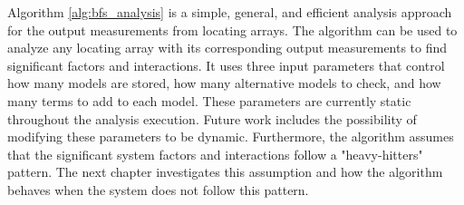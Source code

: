Algorithm \ref{alg:bfs_analysis} is a simple, general, and efficient analysis approach for the output measurements from locating arrays.
The algorithm can be used to analyze any locating array with its corresponding output measurements to find significant factors and interactions.
It uses three input parameters that control how many models are stored, how many alternative models to check, and how many terms to add to each model.
These parameters are currently static throughout the analysis execution.
Future work includes the possibility of modifying these parameters to be dynamic.
Furthermore, the algorithm assumes that the significant system factors and interactions follow a "heavy-hitters" pattern.
The next chapter investigates this assumption and how the algorithm behaves when the system does not follow this pattern.
